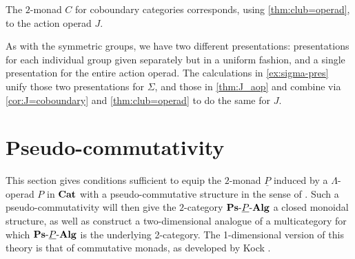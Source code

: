\begin{cor}\label{cor:J=coboundary}
The $2$-monad $C$ for coboundary categories corresponds, using  \cref{thm:club=operad}, to the action operad $J$.
\end{cor}

\begin{rem}
As with the symmetric groups, we have two different presentations: presentations for each individual group given separately but in a uniform fashion, and a single presentation for the entire action operad.
The calculations in \cref{ex:sigma-pres} unify those two presentations for $\Sigma$, and those in \cref{thm:J_aop} and \cite{hk-cobound} combine via \cref{cor:J=coboundary} and \cref{thm:club=operad} to do the same for $J$.
\end{rem}

\section{Pseudo-commutativity}\label{sec:pscomm}

This section gives conditions sufficient to equip the $2$-monad $\underline{P}$ induced by a $\Lambda$-operad $P$ in $\mathbf{Cat}$ with a pseudo-commutative structure in the sense of \cite{HP}. Such a pseudo-commutativity will then give the $2$-category $\mathbf{Ps}\mbox{-}\underline{P}\mbox{-}\mathbf{Alg}$ a closed monoidal structure, as well as construct a two-dimensional analogue of a multicategory for which $\mathbf{Ps}\mbox{-}\underline{P}\mbox{-}\mathbf{Alg}$ is the underlying 2-category.
The 1-dimensional version of this theory is that of commutative monads, as developed by Kock \cite{kock-closed, kock-monads, kock-strong}.

